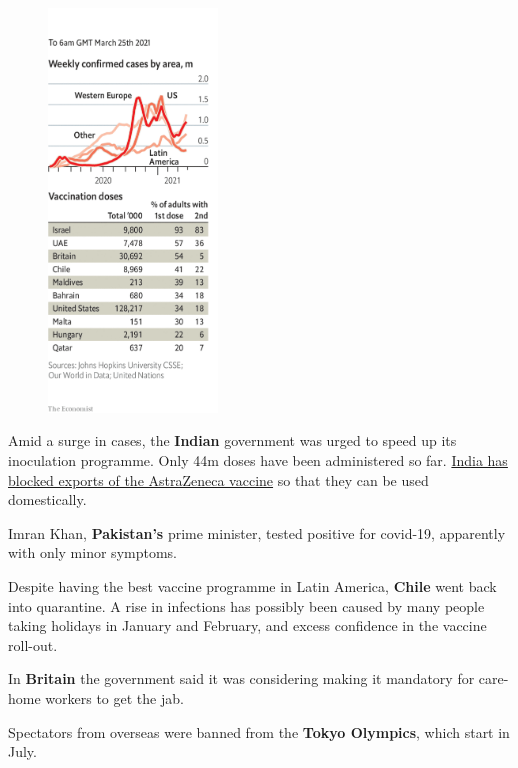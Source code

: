 \documentclass{article}
\begin{document}
\begin{figure}[h]
\centering
\includegraphics[width=0.4\textwidth]{images/20210327_WWC051.png}
\end{figure}


Amid a surge in cases, the \textbf{Indian} government was urged to speed up its inoculation programme. Only 44m doses have been administered so far. \href{/asia/2021/03/27/india-and-china-are-finding-vaccine-diplomacy-tricky}{India has blocked exports of the AstraZeneca vaccine} so that they can be used domestically. 

Imran Khan, \textbf{Pakistan's} prime minister, tested positive for covid-19, apparently with only minor symptoms. 

Despite having the best vaccine programme in Latin America, \textbf{Chile} went back into quarantine. A rise in infections has possibly been caused by many people taking holidays in January and February, and excess confidence in the vaccine roll-out. 

In \textbf{Britain} the government said it was considering making it mandatory for care-home workers to get the jab. 

Spectators from overseas were banned from the \textbf{Tokyo Olympics}, which start in July. 
\clearpage
\subsubsection{ }
\end{document}

